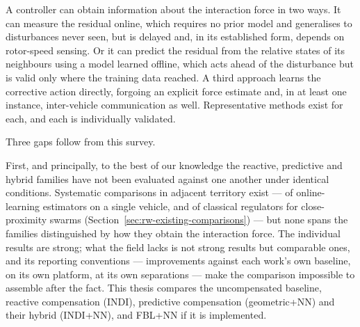 A controller can obtain information about the interaction force in two ways. It can measure the
residual online, which requires no prior model and generalises to disturbances never seen, but is
delayed and, in its established form, depends on rotor-speed sensing. Or it can predict the
residual from the relative states of its neighbours using a model learned offline, which acts ahead
of the disturbance but is valid only where the training data reached. A third approach learns the
corrective action directly, forgoing an explicit force estimate and, in at least one instance,
inter-vehicle communication as well. Representative methods exist for each, and each is
individually validated.

Three gaps follow from this survey.

First, and principally, to the best of our knowledge the reactive, predictive and hybrid families
have not been evaluated against one another under identical conditions. Systematic comparisons in
adjacent territory exist --- of online-learning estimators on a single vehicle, and of classical
regulators for close-proximity swarms (Section~\ref{sec:rw-existing-comparisons}) --- but none
spans the families distinguished by how they obtain the interaction force. The individual results are strong; what the field lacks is not strong results
but comparable ones, and its reporting conventions --- improvements against each work's own
baseline, on its own platform, at its own separations --- make the comparison impossible to
assemble after the fact. This thesis compares the uncompensated baseline, reactive compensation
(INDI), predictive compensation (geometric+NN) and their hybrid (INDI+NN), and FBL+NN if it is
implemented.

